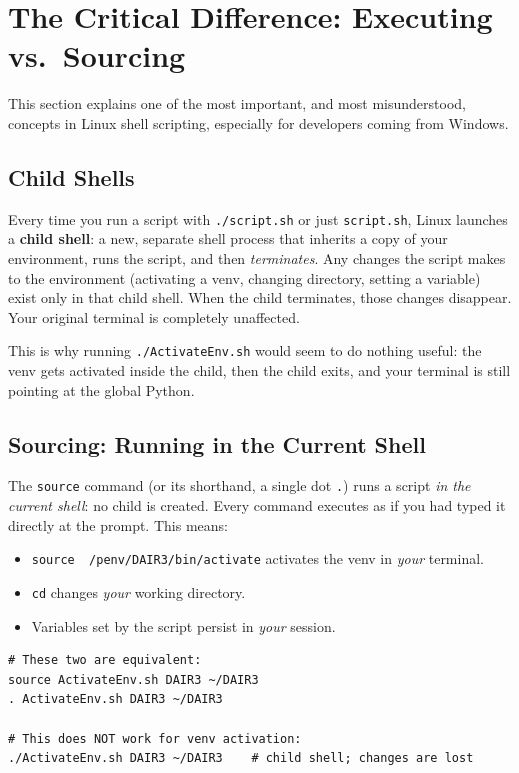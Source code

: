 \section{The Critical Difference: Executing vs.\ Sourcing}
\label{sec:source-vs-execute}

This section explains one of the most important, and most
misunderstood, concepts in Linux shell scripting, especially for
developers coming from Windows.

\subsection{Child Shells}

Every time you run a script with \texttt{./script.sh} or just
\texttt{script.sh}, Linux launches a \textbf{child shell}: a new,
separate shell process that inherits a copy of your environment, runs
the script, and then \emph{terminates}. Any changes the script makes to
the environment (activating a venv, changing directory, setting a
variable) exist only in that child shell. When the child terminates,
those changes disappear. Your original terminal is completely unaffected.

This is why running \texttt{./ActivateEnv.sh} would seem to do
nothing useful: the venv gets activated inside the child, then the child
exits, and your terminal is still pointing at the global Python.

\subsection{Sourcing: Running in the Current Shell}

The \texttt{source} command (or its shorthand, a single dot \texttt{.})
runs a script \emph{in the current shell}: no child is created. Every
command executes as if you had typed it directly at the prompt. This means:

\begin{itemize}
  \item \texttt{source ~/penv/DAIR3/bin/activate} activates the venv
        in \emph{your} terminal.
  \item \texttt{cd} changes \emph{your} working directory.
  \item Variables set by the script persist in \emph{your} session.
\end{itemize}

\begin{lstlisting}[style=linuxStyle]
# These two are equivalent:
source ActivateEnv.sh DAIR3 ~/DAIR3
. ActivateEnv.sh DAIR3 ~/DAIR3

# This does NOT work for venv activation:
./ActivateEnv.sh DAIR3 ~/DAIR3    # child shell; changes are lost
\end{lstlisting}

